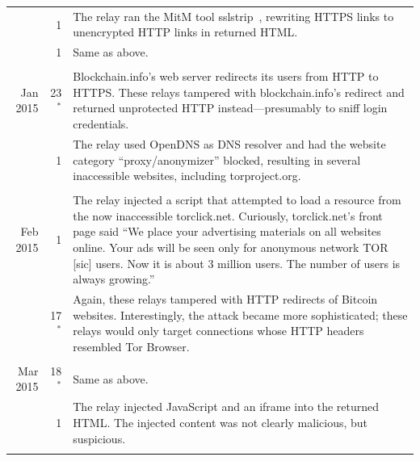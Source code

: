 \begin{table}
\begin{tabularx}{\textwidth}{r r X}
& 1 & The relay ran the MitM tool sslstrip~\cite{sslstrip}, rewriting
HTTPS links to unencrypted HTTP links in returned HTML. \\

& 1 & Same as above. \\

& & \\

Jan 2015 & 23$^*$ & Blockchain.info's web server redirects its
users from HTTP to HTTPS.  These relays tampered with blockchain.info's redirect
and returned unprotected HTTP instead---presumably to sniff login credentials. \\

& 1 & The relay used OpenDNS as DNS resolver and had the website category
``proxy/anonymizer'' blocked, resulting in several inaccessible websites,
including torproject.org. \\

& & \\

Feb 2015 & 1 & The relay injected a script that attempted to load a resource
from the now inaccessible torclick.net.  Curiously, torclick.net's front page
said ``We place your advertising materials on all websites online.  Your ads
will be seen only for anonymous network TOR [sic] users.  Now it is about 3
million users. The number of users is always growing.'' \\

& 17$^*$ & Again, these relays tampered with HTTP redirects of
Bitcoin websites.  Interestingly, the attack became more sophisticated; these
relays would only target connections whose HTTP headers resembled Tor Browser.
\\

& & \\

Mar 2015 & 18$^*$ & Same as above. \\

& 1 & The relay injected JavaScript and an iframe into the returned
HTML.  The injected content was not clearly malicious, but suspicious. \\

& & \\


\end{tabularx}
\end{table}
